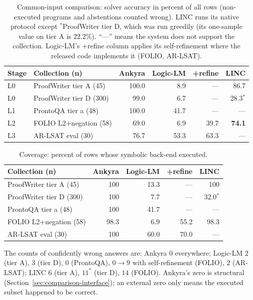 \documentclass[11pt,a4paper]{article}
\begin{document}
\begin{table}[h]
\centering
\small
\begin{tabular}{llrrrr}
\toprule
\textbf{Stage} & \textbf{Collection (n)} & \textbf{Ankyra} & \textbf{Logic-LM} & \textbf{+refine} & \textbf{LINC} \\
\midrule
L0 & ProofWriter tier A (45) & 100.0 & 8.9 & --- & 86.7 \\
L0 & ProofWriter tier D (300) & 99.0 & 6.7 & --- & 28.3$^{\ast}$ \\
L1 & ProntoQA tier a (48) & 100.0 & 41.7 & --- & --- \\
L2 & FOLIO L2+negation (58) & 69.0 & 6.9 & 39.7 & \textbf{74.1} \\
L3 & AR-LSAT eval (30) & 76.7 & 53.3 & 63.3 & --- \\
\bottomrule
\end{tabular}
\caption{Common-input comparison: solver accuracy in percent of all rows (non-executed
programs and abstentions counted wrong). LINC runs its native protocol except
$^{\ast}$ProofWriter tier D, which was run greedily (its one-sample value on tier A is
$22.2\%$). ``---'' means the system does not support the collection. Logic-LM's $+$refine
column applies its self-refinement where the released code implements it (FOLIO, AR-LSAT).}
\label{tab:cmp-main}
\end{table}

\begin{table}[h]
\centering
\small
\begin{tabular}{lrrrr}
\toprule
\textbf{Collection (n)} & \textbf{Ankyra} & \textbf{Logic-LM} & \textbf{+refine} & \textbf{LINC} \\
\midrule
ProofWriter tier A (45) & 100 & 13.3 & --- & 100 \\
ProofWriter tier D (300) & 100 & 7.7 & --- & 32.0$^{\ast}$ \\
ProntoQA tier a (48) & 100 & 41.7 & --- & --- \\
FOLIO L2+negation (58) & 98.3 & 6.9 & 55.2 & 98.3 \\
AR-LSAT eval (30) & 100 & 60.0 & 70.0 & --- \\
\bottomrule
\end{tabular}
\caption{Coverage: percent of rows whose symbolic back-end executed.}
\label{tab:cmp-cover}
\end{table}

The counts of confidently wrong answers are: Ankyra $0$ everywhere; Logic-LM $2$ (tier A),
$3$ (tier D), $0$ (ProntoQA), $0\to9$ with self-refinement (FOLIO), $2$ (AR-LSAT); LINC $6$
(tier A), $11^{\ast}$ (tier D), $14$ (FOLIO). Ankyra's zero is structural
(Section~\ref{sec:comparison-interface}); an external zero only means the executed subset
happened to be correct.
\end{document}
